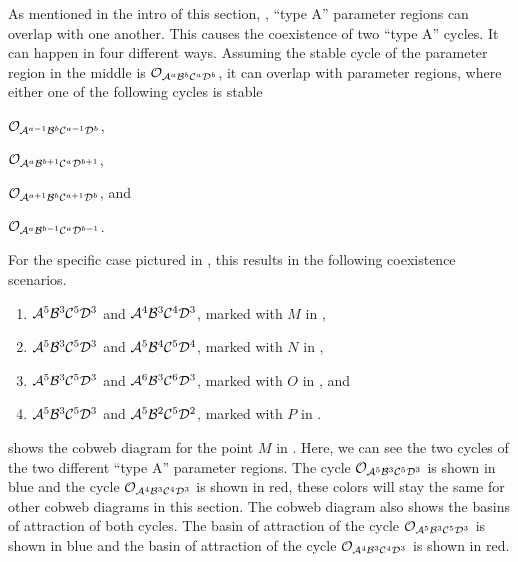 As mentioned in the intro of this section, , ``type A'' parameter regions can overlap with one another.
This causes the coexistence of two ``type A'' cycles.
It can happen in four different ways.
Assuming the stable cycle of the parameter region in the middle is $\mathcal{O}_{\mathcal{A}^a\mathcal{B}^b\mathcal{C}^a\mathcal{D}^b}$, it can overlap with parameter regions, where either one of the following cycles is stable
\begin{enumerate*}
	\item $\mathcal{O}_{\mathcal{A}^{a-1}\mathcal{B}^b\mathcal{C}^{a-1}\mathcal{D}^b}$,
	\item $\mathcal{O}_{\mathcal{A}^a\mathcal{B}^{b+1}\mathcal{C}^a\mathcal{D}^{b+1}}$,
	\item $\mathcal{O}_{\mathcal{A}^{a+1}\mathcal{B}^b\mathcal{C}^{a+1}\mathcal{D}^b}$, and
	\item $\mathcal{O}_{\mathcal{A}^a\mathcal{B}^{b-1}\mathcal{C}^a\mathcal{D}^{b-1}}$.
\end{enumerate*}
For the specific case pictured in , this results in the following coexistence scenarios.
\begin{enumerate}
	\item $\mathcal{A}^5\mathcal{B}^3\mathcal{C}^5\mathcal{D}^3$ and $\mathcal{A}^4\mathcal{B}^3\mathcal{C}^4\mathcal{D}^3$, marked with $M$ in ,
	\item $\mathcal{A}^5\mathcal{B}^3\mathcal{C}^5\mathcal{D}^3$ and $\mathcal{A}^5\mathcal{B}^4\mathcal{C}^5\mathcal{D}^4$, marked with $N$ in ,
	\item $\mathcal{A}^5\mathcal{B}^3\mathcal{C}^5\mathcal{D}^3$ and $\mathcal{A}^6\mathcal{B}^3\mathcal{C}^6\mathcal{D}^3$, marked with $O$ in , and
	\item $\mathcal{A}^5\mathcal{B}^3\mathcal{C}^5\mathcal{D}^3$ and $\mathcal{A}^5\mathcal{B}^2\mathcal{C}^5\mathcal{D}^2$, marked with $P$ in .
\end{enumerate}
 shows the cobweb diagram for the point $M$ in .
Here, we can see the two cycles of the two different ``type A'' parameter regions.
The cycle $\mathcal{O}_{\mathcal{A}^5\mathcal{B}^3\mathcal{C}^5\mathcal{D}^3}$ is shown in blue and the cycle $\mathcal{O}_{\mathcal{A}^4\mathcal{B}^3\mathcal{C}^4\mathcal{D}^3}$ is shown in red, these colors will stay the same for other cobweb diagrams in this section.
The cobweb diagram also shows the basins of attraction of both cycles.
The basin of attraction of the cycle $\mathcal{O}_{\mathcal{A}^5\mathcal{B}^3\mathcal{C}^5\mathcal{D}^3}$ is shown in blue and the basin of attraction of the cycle $\mathcal{O}_{\mathcal{A}^4\mathcal{B}^3\mathcal{C}^4\mathcal{D}^3}$ is shown in red.

